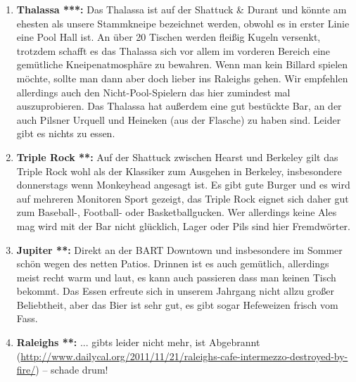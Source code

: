\documentclass[a4paper]{scrreprt}
\begin{document}
\begin{enumerate}

  \item \textbf{Thalassa ***:} Das Thalassa ist auf der Shattuck \& Durant und könnte am ehesten als unsere Stammkneipe bezeichnet werden, obwohl es in erster Linie eine Pool Hall ist. An über 20 Tischen werden fleißig Kugeln versenkt, trotzdem schafft es das Thalassa sich vor allem im vorderen Bereich eine gemütliche Kneipenatmosphäre zu bewahren. Wenn man kein Billard spielen möchte, sollte man dann aber doch lieber ins Raleighs gehen. Wir empfehlen allerdings auch den Nicht-Pool-Spielern das hier zumindest mal auszuprobieren. Das Thalassa hat außerdem eine gut bestückte Bar, an der auch Pilsner Urquell und Heineken (aus der Flasche) zu haben sind. Leider gibt es nichts zu essen.

  \item \textbf{Triple Rock **:} Auf der Shattuck zwischen Hearst und Berkeley gilt das Triple Rock wohl als der Klassiker zum Ausgehen in Berkeley, insbesondere donnerstags wenn Monkeyhead angesagt ist. Es gibt gute Burger und es wird auf mehreren Monitoren Sport gezeigt, das Triple Rock eignet sich daher gut zum Baseball-, Football- oder Basketballgucken. Wer allerdings keine Ales mag wird mit der Bar nicht glücklich, Lager oder Pils sind hier Fremdwörter.
  
  \item \textbf{Jupiter **:} Direkt an der BART Downtown und insbesondere im Sommer schön wegen des netten Patios. Drinnen ist es auch gemütlich, allerdings meist recht warm und laut, es kann auch passieren dass man keinen Tisch bekommt. Das Essen erfreute sich in unserem Jahrgang nicht allzu großer Beliebtheit, aber das Bier ist sehr gut, es gibt sogar Hefeweizen frisch vom Fass.
  
  \item \textbf{Raleighs **:} ... gibts leider nicht mehr, ist Abgebrannt (\url{http://www.dailycal.org/2011/11/21/raleighs-cafe-intermezzo-destroyed-by-fire/}) -- schade drum!
  

\end{enumerate}
\end{document}
